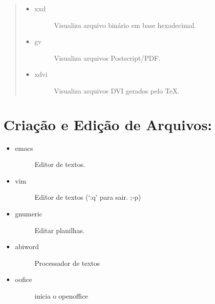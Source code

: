 \documentclass[a4paper,10pt,brazil]{sphinxmanual}
\begin{document}
\begin{quote}
\begin{itemize}
\item {} \begin{description}
\item[{xxd}] \leavevmode
Visualiza arquivo binário em base hexadecimal.

\end{description}

\item {} \begin{description}
\item[{gv}] \leavevmode
Visualiza arquivos Postscript/PDF.

\end{description}

\item {} \begin{description}
\item[{xdvi}] \leavevmode
Visualiza arquivos DVI gerados pelo TeX.

\end{description}

\end{itemize}
\end{quote}


\section{Criação e Edição de Arquivos:}
\label{unix:criacao-e-edicao-de-arquivos}\begin{itemize}
\item {} \begin{description}
\item[{emacs}] \leavevmode
Editor de textos.

\end{description}

\item {} \begin{description}
\item[{vim}] \leavevmode
Editor de textos (`:q' para sair. ;-p)

\end{description}

\item {} \begin{description}
\item[{gnumeric}] \leavevmode
Editar planilhas.

\end{description}

\item {} \begin{description}
\item[{abiword}] \leavevmode
Processador de textos

\end{description}

\item {} \begin{description}
\item[{oofice}] \leavevmode
inicia o openoffice

\end{description}

\end{itemize}
\end{document}
